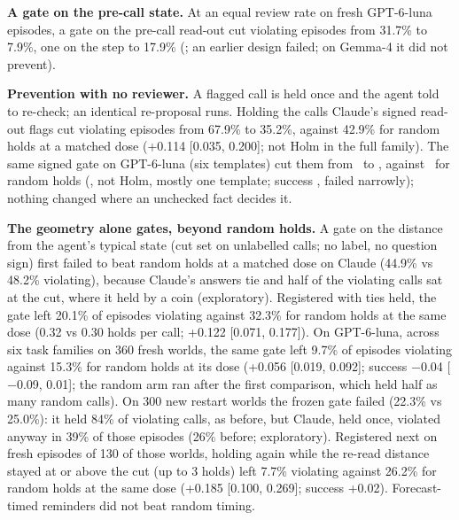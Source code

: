 \textbf{A gate on the pre-call state.} At an equal review rate on fresh GPT-6-luna episodes, a gate on the pre-call read-out cut violating episodes from 31.7\% to 7.9\%, one on the step to 17.9\% (\GLbPmP; an earlier design failed; on Gemma-4 it did not prevent).

\textbf{Prevention with no reviewer.} A flagged call is held once and the agent told to re-check; an identical re-proposal runs. Holding the calls Claude's signed read-out flags cut violating episodes from 67.9\% to 35.2\%, against 42.9\% for random holds at a matched dose (+0.114 [0.035, 0.200]; not Holm in the full family). The same signed gate on GPT-6-luna (six templates) cut them from \GSgGNone\ to \GSgGSelf, against \GSgGRand\ for random holds (\GSgGDiff, not Holm, mostly one template; success \GSgGSucc, failed narrowly); nothing changed where an unchecked fact decides it. 

\textbf{The geometry alone gates, beyond random holds.} A gate on the distance from the agent's typical state (cut set on unlabelled calls; no label, no question sign) first failed to beat random holds at a matched dose on Claude (44.9\% vs 48.2\% violating), because Claude's answers tie and half of the violating calls sat at the cut, where it held by a coin (exploratory). Registered with ties held, the gate left 20.1\% of episodes violating against 32.3\% for random holds at the same dose (0.32 vs 0.30 holds per call; +0.122 [0.071, 0.177]). On GPT-6-luna, across six task families on 360 fresh worlds, the same gate left 9.7\% of episodes violating against 15.3\% for random holds at its dose (+0.056 [0.019, 0.092]; success $-$0.04 [$-$0.09, 0.01]; the random arm ran after the first comparison, which held half as many random calls). On 300 new restart worlds the frozen gate failed (22.3\% vs 25.0\%): it held 84\% of violating calls, as before, but Claude, held once, violated anyway in 39\% of those episodes (26\% before; exploratory). Registered next on fresh episodes of 130 of those worlds, holding again while the re-read distance stayed at or above the cut (up to 3 holds) left 7.7\% violating against 26.2\% for random holds at the same dose (+0.185 [0.100, 0.269]; success +0.02). Forecast-timed reminders did not beat random timing.
